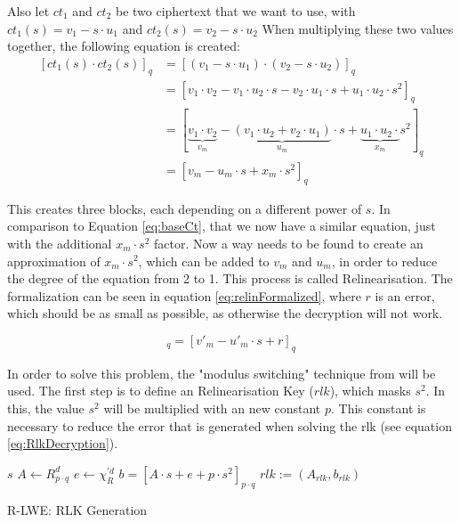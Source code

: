 Also let $ct_1$ and $ct_2$ be two ciphertext that we want to use, with $ct_1(s) = v_1-s\cdot u_1$ and $ct_2(s) = v_2-s\cdot u_2$
When multiplying these two values together, the following equation is created:
\begin{equation}
  \begin{split}
    [ct_1(s)\cdot ct_2(s)]_q & = [(v_1-s\cdot u_1) \cdot (v_2-s\cdot u_2)]_q                                          \\
                         & = [v_1\cdot v_2 - v_1\cdot u_2 \cdot s- v_2\cdot u_1\cdot s + u_1\cdot u_2\cdot s^2]_q \\
                         & = [\underbrace{v_1\cdot v_2}_{v_m} - \underbrace{(v_1\cdot u_2 + v_2\cdot u_1)}_{u_m}\cdot s + \underbrace{u_1\cdot u_2\cdot}_{x_m} s^2]_q \\
                         & = [v_m - u_m\cdot s + x_m \cdot s^2]_q
  \end{split}
  \label{eq:ciphertextMultiplication}
\end{equation}

This creates three blocks, each depending on a different power of $s$. In comparison to Equation \ref{eq:baseCt}, that we now have a similar equation, just with the additional $x_m\cdot s^2$ factor. 
Now a way needs to be found to create an approximation of $x_m\cdot s^2$, which can be added to $v_m$ and $u_m$, in order to reduce the degree of the equation from 2 to 1. This process is called Relinearisation. The formalization can be seen in equation \ref{eq:relinFormalized}, where $r$ is an error, which should be as small as possible, as otherwise the decryption will not work.

\begin{equation}
  [v_m - u_m\cdot s + x_m \cdot s^2]_q = [v'_m - u'_m\cdot s + r]_q
  \label{eq:relinFormalized}
\end{equation}

In order to solve this problem, the "modulus switching" technique from \cite{bfv} will be used. The first step is to define an Relinearisation Key ($rlk$), which masks $s^2$. In this, the value $s^2$ will be multiplied with an new constant $p$. This constant is necessary to reduce the error that is generated when solving the rlk (see equation \ref{eq:RlkDecryption}).

\begin{algorithm}[htb]
  \begin{algorithmic}[1]
    \REQUIRE $s$
    \STATE $A \leftarrow R^d_{p \cdot q}$
    \STATE $e \leftarrow \chi_R^{'d}$
    \STATE $b = [A\cdot s+e+p\cdot s^2]_{p \cdot q}$
    \RETURN $rlk:=(A_{rlk}, b_{rlk})$
  \end{algorithmic}
  \caption{R-LWE: RLK Generation}
  \label{alg:RingRLKGeneration}
\end{algorithm}

